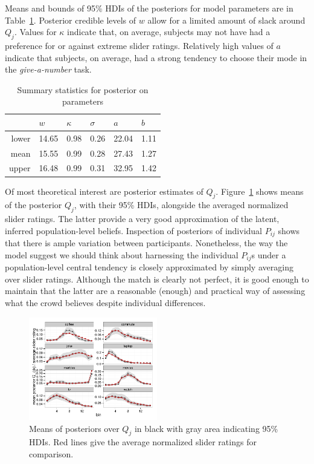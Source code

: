 \documentclass[10pt,letterpaper]{article}
\begin{document}
Means and bounds of 95\% HDIs of the posteriors for model parameters are in
Table~\ref{tab:SummaryStats}. Posterior credible levels of $w$ allow for a limited amount of
slack around $Q_j$. Values for $\kappa$ indicate that, on average, subjects may not have had a
preference for or against extreme slider ratings. Relatively high values of $a$ indicate that
subjects, on average, had a strong tendency to choose their mode in the \emph{give-a-number}
task.
\begin{table}[ht]
\centering
\begin{tabular}{rlllll}
 & $w$ & $\kappa$ & $\sigma$ & $a$ & $b$ \\ \hline
  lower & 14.65 &  0.98 &  0.26 & 22.04 &  1.11 \\ 
  mean & 15.55 &  0.99 &  0.28 & 27.43 &  1.27 \\ 
  upper & 16.48 &  0.99 &  0.31 & 32.95 &  1.42 \\ 
   \hline
\end{tabular}
\caption{Summary statistics for posterior on parameters}
\label{tab:SummaryStats}
\end{table}

Of most theoretical interest are posterior estimates of $Q_j$. Figure~\ref{fig:PosteriorQj}
shows means of the posterior $Q_j$, with their 95\% HDIs, alongside the averaged normalized
slider ratings. The latter provide a very good approximation of the latent, inferred
population-level beliefs. Inspection of posteriors of individual $P_{ij}$ shows that there is
ample variation between participants. Nonetheless, the way the model suggest we should think about
harnessing the individual $P_{ij}$s under a population-level central tendency is closely
approximated by simply averaging over slider ratings. Although the match is clearly not
perfect, it is good enough to maintain that the latter are a reasonable (enough) and practical
way of assessing what the crowd believes despite individual differences.

\begin{figure}
  \centering
  \includegraphics[width = 0.5\textwidth]{plots/pop_priors.pdf}
  \caption{Means of posteriors over $Q_j$ in black with gray area indicating 95\% HDIs. Red
    lines give the average normalized slider ratings for comparison.}
  \label{fig:PosteriorQj}
\end{figure}
\end{document}
